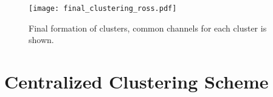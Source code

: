 \documentclass[journal,comsoc]{IEEEtran}
\theoremstyle{mytheoremstyle}
\theoremstyle{mytheoremstyle}
\theoremstyle{mytheoremstyle}
\begin{document}
\begin{comment}
As an example, when node A comes to decide which cluster to stay, the memberships of relevant clusters, like $C_C$ and $C_H$, are $\{C,B,D,A\}$ and $\{H,B,G,A\}$ respectively. Before the other two debatable nodes B and D making their belonging clear, cluster $C_C$ and $C_H$ have them in the same time. So node A can decide which cluster to belong to without considering other debatable nodes' action. There are two strategies for node A, which is illustrated in Figure \ref{fig3}. Because staying in cluster $C_C$ brings in more common channels within relevant clusters, node A finally choose cluster $C_C$ to stay and caveat from cluster $C_H$. The membership of $C_H$ is updated in the same time. Node B and D undertake the same process and the clusters are formed finally as Figure \ref{fig4} shows.

Because debatable nodes can conduct membership clarification abased on static membership information of relevant clusters, thus no iteration happens in this process. The time complexity of this algorithm is only decided by the number of debatable nodes, which is maximal $O(\vert I\vert)$. 

As an example, when node A comes to decide which cluster to stay, the memberships of relevant clusters, like $C_C$ and $C_H$, are $\{C,B,D,A\}$ and $\{H,B,G,A\}$ respectively. Before the other two debatable nodes B and D making their belonging clear, cluster $C_C$ and $C_H$ have them in the same time. So node A can decide which cluster to belong to without considering other debatable nodes' action. Figure \ref{AinC}. Because staying in cluster $C_C$ brings in more common channels within relevant clusters, node A finally choose cluster $C_C$ to stay and retreat from cluster $C_H$. The membership of $C_H$ is updated in the same time. Node B and D undertake the same process and the clusters are formed finally as Figure \ref{fig4} shows.
\end{comment}


\begin{figure}[h]
  \centering
  \texttt{[image: final\_clustering\_ross.pdf]}
  \caption{Final formation of clusters, common channels for each cluster is shown.}
  \label{fig4}
\end{figure}


\newpage
\section{Centralized Clustering Scheme}
\label{centralized_scheme}
\end{document}
